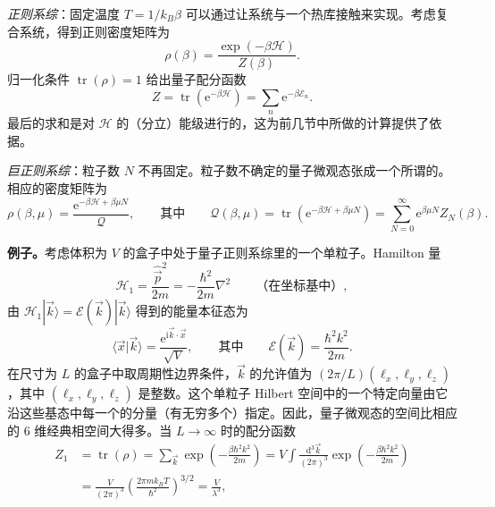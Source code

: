 
\emph{正则系综}：固定温度 $T=1/k_B\beta$ 可以通过让系统与一个热库接触来实现。考虑复合系统，得到正则密度矩阵为
\begin{equation}\label{eq:6.86}
\rho(\beta)=\frac{\exp(-\beta\mathscr H)}{Z(\beta)}.
\end{equation}
归一化条件 $\operatorname{tr}(\rho)=1$ 给出量子配分函数
\begin{equation}\label{eq:6.87}
Z=\operatorname{tr}\left(\mathrm e^{-\beta\mathscr H}\right)=\sum_n\mathrm e^{-\beta\mathcal E_n}.
\end{equation}
最后的求和是对 $\mathscr H$ 的（分立）能级进行的，这为前几节中所做的计算提供了依据。

\emph{巨正则系综}：粒子数 $N$ 不再固定。粒子数不确定的量子微观态张成一个所谓的。相应的密度矩阵为
\begin{equation}\label{eq:6.88}
\rho(\beta,\mu)=\frac{\mathrm e^{-\beta\mathscr H+\beta\mu N}}{\mathcal Q},\qquad\text{其中}\qquad\mathcal Q(\beta,\mu)=\operatorname{tr}\left(\mathrm e^{-\beta\mathscr H+\beta\mu N}\right)=\sum_{N=0}^\infty\mathrm e^{\beta\mu N}Z_N(\beta).
\end{equation}

\textbf{例子。}考虑体积为 $V$ 的盒子中处于量子正则系综里的一个单粒子。Hamilton 量
\begin{equation}\label{eq:6.89}
\mathscr H_1=\frac{\hat{\vec p}^2}{2m}=-\frac{\hbar^2}{2m}\nabla^2\qquad\text{（在坐标基中）},
\end{equation}
由 $\mathscr H_1|\vec k\rangle=\mathcal E(\vec k)|\vec k\rangle$ 得到的能量本征态为
\begin{equation}\label{eq:6.90}
\langle\vec x|\vec k\rangle=\frac{\mathrm e^{\mathrm i\vec k\cdot\vec x}}{\sqrt V},\qquad\text{其中}\qquad\mathcal E(\vec k)=\frac{\hbar^2k^2}{2m}.
\end{equation}
在尺寸为 $L$ 的盒子中取周期性边界条件，$\vec k$ 的允许值为 $(2\pi/L)(\ell_x,\ell_y,\ell_z)$，其中 $(\ell_x,\ell_y,\ell_z)$ 是整数。这个单粒子 Hilbert 空间中的一个特定向量由它沿这些基态中每一个的分量（有无穷多个）指定。因此，量子微观态的空间比相应的 6 维经典相空间大得多。当 $L\to\infty$ 时的配分函数
\begin{equation}\label{eq:6.91}
\begin{aligned}
Z_1&=\operatorname{tr}(\rho)=\sum_{\vec k}\exp\left(-\frac{\beta\hbar^2k^2}{2m}\right)=V\int\frac{\mathrm d^3\vec k}{(2\pi)^3}\exp\left(-\frac{\beta\hbar^2k^2}{2m}\right)\\
&=\frac V{(2\pi)^3}\left(\frac{2\pi mk_BT}{\hbar^2}\right)^{3/2}=\frac V{\lambda^3},
\end{aligned}
\end{equation}

